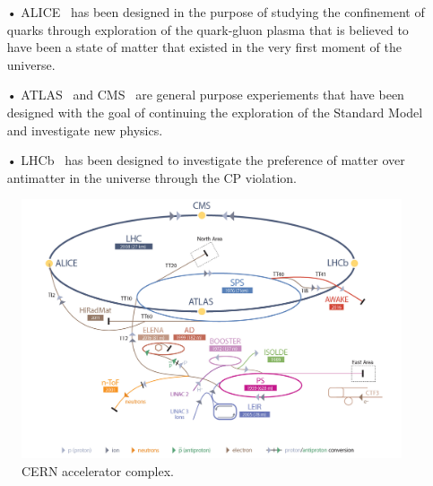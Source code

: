 	\begin{itemize}
		\item[•] ALICE~\cite{ALICELOI} has been designed in the purpose of studying the confinement of quarks through exploration of the quark-gluon plasma that is believed to have been a state of matter that existed in the very first moment of the universe.
		\item[•] ATLAS~\cite{ATLASLOI} and CMS~\cite{CMSLOI} are general purpose experiements that have been designed with the goal of continuing the exploration of the Standard Model and investigate new physics.
		\item[•] LHCb~\cite{LHCBLOI} has been designed to investigate the preference of matter over antimatter in the universe through the CP violation.
	\end{itemize}

	\begin{figure}[H]
		\centering
		\includegraphics[width=\linewidth]{fig/chapt2/CERN_Accelerator_Complex.png}
		\caption{\label{fig:CERNComplex} CERN accelerator complex.}
	\end{figure}
	
